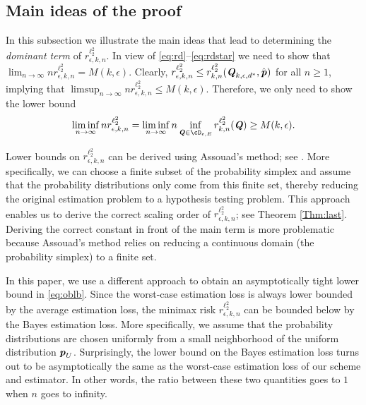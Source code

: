 \documentclass[11pt,onecolumn]{IEEEtran}
\def\mathbi#1{{\textbf{\textit #1}}}
\begin{document}
\subsection{Main ideas of the proof}
In this subsection we illustrate the main ideas that lead to determining the {\em dominant term} of $r_{\epsilon, k,n}^{\ell_2^2}$.
In view of \eqref{eq:rd}--\eqref{eq:rdstar} we need to show that
$
\lim_{n\to \infty} n r_{\epsilon,k,n}^{\ell_2^2} = M(k,\epsilon).
$
Clearly, $r_{\epsilon, k,n}^{\ell_2^2} \le
 r_{k,n}^{\ell_2^2} (\mathbi{Q}_{k,\epsilon,d^\ast}, \hat{\mathbi{p}})$
for all $n\ge 1$, implying that
$
\limsup_{n\to \infty} n r_{\epsilon,k,n}^{\ell_2^2} \le 
M(k,\epsilon).
$
Therefore, we only need to show the lower bound
\begin{equation}\label{eq:oblb}
\liminf_{n\to \infty} n r_{\epsilon,k,n}^{\ell_2^2} =
\liminf_{n\to \infty} n \inf_{\mathbi{Q} \in \cD_{\epsilon,E}} r_{k,n}^{\ell_2^2} (\mathbi{Q}) \ge 
M(k,\epsilon).
\end{equation}

Lower bounds on $r_{\epsilon,k,n}^{\ell_2^2}$ can be derived using Assouad's method; see \cite{Duchi16,Ye17}. 
More specifically, we can choose a finite subset of the probability simplex and assume that the probability distributions only come from 
this finite set, thereby reducing the original estimation problem to a hypothesis testing problem. This approach enables
us to derive the correct scaling order of $r_{\epsilon, k,n}^{\ell_2^2}$; see Theorem \ref{Thm:last}. Deriving the correct constant in front of the main
term is more problematic because {Assouad's method relies on reducing} a continuous domain (the probability simplex) to a finite set.

In this paper, we use a different approach to obtain an asymptotically tight lower bound in \eqref{eq:oblb}.
Since the worst-case estimation loss is always lower bounded by the average estimation loss, the minimax risk $r_{\epsilon, k,n}^{\ell_2^2}$ can be bounded below by the Bayes estimation loss. More specifically, we assume that the probability distributions are chosen uniformly from a small neighborhood of the uniform distribution $\mathbi{p}_U$. Surprisingly, the lower bound on the Bayes estimation loss turns out to be asymptotically the same as the worst-case estimation loss of our scheme and estimator. In other words, the ratio between these two quantities goes to $1$ when $n$ goes to infinity.
\end{document}
